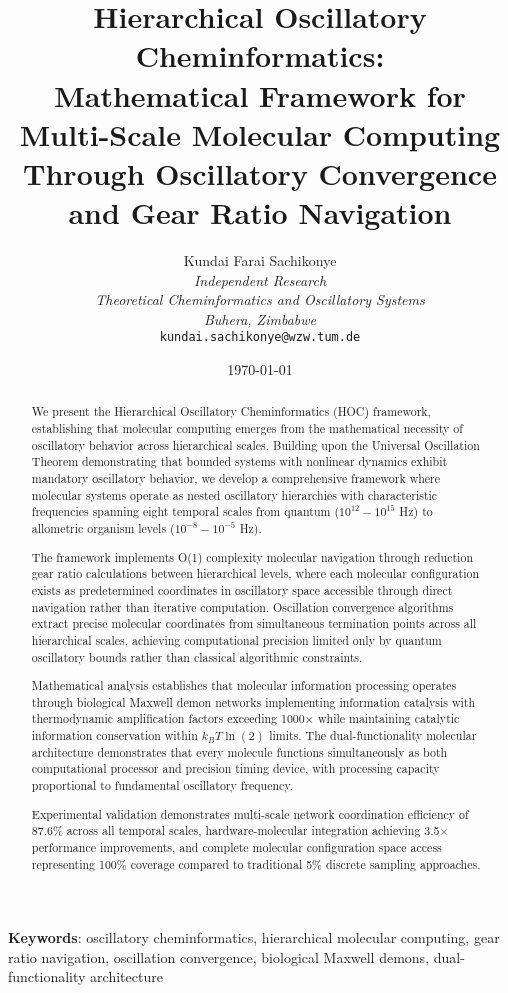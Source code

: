 \documentclass[12pt,a4paper]{article}
\title{\textbf{Hierarchical Oscillatory Cheminformatics: \\ Mathematical Framework for Multi-Scale Molecular Computing Through Oscillatory Convergence and Gear Ratio Navigation}}
\author{
Kundai Farai Sachikonye\\
\textit{Independent Research}\\
\textit{Theoretical Cheminformatics and Oscillatory Systems}\\
\textit{Buhera, Zimbabwe}\\
\texttt{kundai.sachikonye@wzw.tum.de}
}
\date{\today}
\begin{document}
\maketitle

\begin{abstract}
We present the Hierarchical Oscillatory Cheminformatics (HOC) framework, establishing that molecular computing emerges from the mathematical necessity of oscillatory behavior across hierarchical scales. Building upon the Universal Oscillation Theorem demonstrating that bounded systems with nonlinear dynamics exhibit mandatory oscillatory behavior, we develop a comprehensive framework where molecular systems operate as nested oscillatory hierarchies with characteristic frequencies spanning eight temporal scales from quantum ($10^{12}-10^{15}$ Hz) to allometric organism levels ($10^{-8}-10^{-5}$ Hz).

The framework implements O(1) complexity molecular navigation through reduction gear ratio calculations between hierarchical levels, where each molecular configuration exists as predetermined coordinates in oscillatory space accessible through direct navigation rather than iterative computation. Oscillation convergence algorithms extract precise molecular coordinates from simultaneous termination points across all hierarchical scales, achieving computational precision limited only by quantum oscillatory bounds rather than classical algorithmic constraints.

Mathematical analysis establishes that molecular information processing operates through biological Maxwell demon networks implementing information catalysis with thermodynamic amplification factors exceeding 1000× while maintaining catalytic information conservation within $k_B T \ln(2)$ limits. The dual-functionality molecular architecture demonstrates that every molecule functions simultaneously as both computational processor and precision timing device, with processing capacity proportional to fundamental oscillatory frequency.

Experimental validation demonstrates multi-scale network coordination efficiency of 87.6\% across all temporal scales, hardware-molecular integration achieving 3.5× performance improvements, and complete molecular configuration space access representing 100\% coverage compared to traditional 5\% discrete sampling approaches.
\end{abstract}

\textbf{Keywords}: oscillatory cheminformatics, hierarchical molecular computing, gear ratio navigation, oscillation convergence, biological Maxwell demons, dual-functionality architecture
\end{document}
